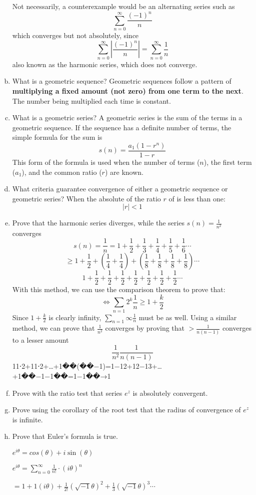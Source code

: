 \documentclass{article}
\begin{document}
\begin{enumerate}[a.]
	Not necessarily, a counterexample would be an alternating series such as
	\[\sum_{n=0}^{\infty}\frac{(-1)^n}{n}\]
	which converges but not absolutely, since
	\[\sum_{n=0}^{\infty}|\frac{(-1)^n}{n}| = \sum_{n=0}^{\infty}\frac{1}{n}\]
	also known as the harmonic series, which does not converge.
	\item What is a geometric sequence?
	Geometric sequences follow a pattern of \textbf{multiplying a fixed amount (not zero) from one term to the next}. The number being multiplied each time is constant.
	\item What is a geometric series?
	A geometric series is the sum of the terms in a geometric sequence. If the sequence has a definite number of terms, the simple formula for the sum is
    \[s(n) = \frac{a_1(1-r^n)}{1-r}\]
    This form of the formula is used when the number of terms ($n$), the first term ($a_1$), and the common ratio ($r$) are known.
	\item What criteria guarantee convergence of either a geometric sequence or geometric series?
	When the absolute of the ratio $r$ of is less than one:
	\[|r| < 1\]
	\item Prove that the harmonic series diverges, while the series $s(n) = \frac{1}{n^2} $ converges
	\[s(n) = \frac{1}{n} = 1+\frac{1}{2}+\frac{1}{3}+\frac{1}{4}+\frac{1}{5}+\frac{1}{6}\cdots\]
	\[\geq 1+\frac{1}{2}+(\frac{1}{4}+\frac{1}{4})+(\frac{1}{8}+\frac{1}{8}+\frac{1}{8}+\frac{1}{8})\cdots\]
	\[1+\frac{1}{2}+\frac{1}{2}+\frac{1}{2}+\frac{1}{2}+\frac{1}{2}+\frac{1}{2}+\frac{1}{2}\cdots\]
	With this method, we can use the comparison theorem to prove that:
	\[\iff \sum_{n=1}{2^k}\frac{1}{n}\geq 1+\frac{k}{2}\]
	Since $1+\frac{k}{2}$ is clearly infinity, $\sum_{n=1}{\infty}\frac{1}{n}$ must be as well.
	Using a similar method, we can prove that $\frac{1}{n^2}$ converges by proving that $>\frac{1}{n(n-1)}$ converges to a lesser amount
	\[\frac{1}{n^2}\frac{1}{n(n-1)} \]
	11⋅2+11⋅2+…+1��(��−1)=1−12+12−13+…+1��−1−1��=1−1��→1
	\item Prove with the ratio test that series $e^z$ is absolutely convergent.
	\item Prove using the corollary of the root test that the radius of convergence of $e^z$ is infinite.
	\item Prove that Euler's formula is true.

	$e^{i\theta} = cos(\theta) + i\sin(\theta)$

	$e^{i\theta} = \sum_{n=0}^{\infty} \frac{1}{n!} \cdot (i\theta)^n$

	$ = 1 + 1(i\theta) + \frac{1}{2!}(\sqrt{-1}\theta)^2 + \frac{1}{3}(\sqrt{-1}\theta)^3 \cdots $


\end{enumerate}
\end{document}
